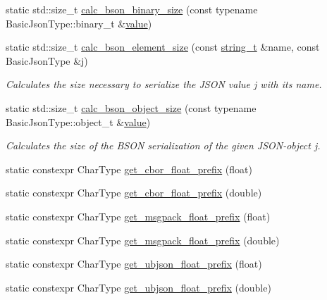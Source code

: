 \begin{DoxyCompactItemize}
\item 
static std\+::size\+\_\+t \hyperlink{classnlohmann_1_1detail_1_1binary__writer_a9dd6062fd249a695e0f93d558dba4685}{calc\+\_\+bson\+\_\+binary\+\_\+size} (const typename Basic\+Json\+Type\+::binary\+\_\+t \&\hyperlink{namespacenlohmann_1_1detail_a2fb6dae6578e06ae73ca0d7cc8512b1aa2063c1608d6e0baf80249c42e2be5804}{value})
\item 
static std\+::size\+\_\+t \hyperlink{classnlohmann_1_1detail_1_1binary__writer_a1e4372c5984184eb5bcc09af1fcc2ee0}{calc\+\_\+bson\+\_\+element\+\_\+size} (const \hyperlink{classnlohmann_1_1detail_1_1binary__writer_a29f2ae7a5c4a8c1dae47b3b2310de8a8}{string\+\_\+t} \&name, const Basic\+Json\+Type \&j)
\begin{DoxyCompactList}\small\item\em Calculates the size necessary to serialize the J\+S\+ON value {\itshape j} with its {\itshape name}. \end{DoxyCompactList}\item 
static std\+::size\+\_\+t \hyperlink{classnlohmann_1_1detail_1_1binary__writer_acc6f1cc1fd370ee84ebc8cf7b8712840}{calc\+\_\+bson\+\_\+object\+\_\+size} (const typename Basic\+Json\+Type\+::object\+\_\+t \&\hyperlink{namespacenlohmann_1_1detail_a2fb6dae6578e06ae73ca0d7cc8512b1aa2063c1608d6e0baf80249c42e2be5804}{value})
\begin{DoxyCompactList}\small\item\em Calculates the size of the B\+S\+ON serialization of the given J\+S\+O\+N-\/object {\itshape j}. \end{DoxyCompactList}\item 
static constexpr Char\+Type \hyperlink{classnlohmann_1_1detail_1_1binary__writer_a2b5cb010077da6241a18bb334736464c}{get\+\_\+cbor\+\_\+float\+\_\+prefix} (float)
\item 
static constexpr Char\+Type \hyperlink{classnlohmann_1_1detail_1_1binary__writer_afe5ac43e05973ba09ee79227bb589b59}{get\+\_\+cbor\+\_\+float\+\_\+prefix} (double)
\item 
static constexpr Char\+Type \hyperlink{classnlohmann_1_1detail_1_1binary__writer_ad452d114696407b98abc69b6001c270e}{get\+\_\+msgpack\+\_\+float\+\_\+prefix} (float)
\item 
static constexpr Char\+Type \hyperlink{classnlohmann_1_1detail_1_1binary__writer_a47234a6e7ac9206d43553985f4cacbf2}{get\+\_\+msgpack\+\_\+float\+\_\+prefix} (double)
\item 
static constexpr Char\+Type \hyperlink{classnlohmann_1_1detail_1_1binary__writer_a6837b20574152f7f645d0f6cd9fafdeb}{get\+\_\+ubjson\+\_\+float\+\_\+prefix} (float)
\item 
static constexpr Char\+Type \hyperlink{classnlohmann_1_1detail_1_1binary__writer_a19eb47a53dbbe28f319532bef25d84e6}{get\+\_\+ubjson\+\_\+float\+\_\+prefix} (double)
\end{DoxyCompactItemize}
